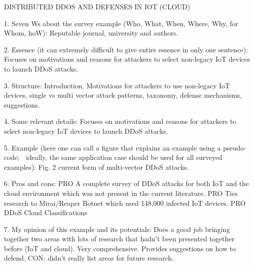 DISTRIBUTED DDOS AND DEFENSES IN IOT (CLOUD)

1. Seven Ws about the survey example (Who, What, When, Where, Why, for Whom, hoW): Reputable journal, university and authors.

2. Essence (it can extremely difficult to give entire essence in only one sentence): Focuses on  motivations and reasons for attackers to select non-legacy IoT devices to launch DDoS attacks.

3. Structure: Introduction, Motivations for attackers to use non-legacy IoT devices, single vs multi vector attack patterns, taxonomy, defense mechanisms, suggestions.

4. Some relevant details: Focuses on  motivations and reasons for attackers to select non-legacy IoT devices to launch DDoS attacks.

5. Example (here one can call a figure that explains an example using a pseudo-code;  ideally, the same application case should be used for all surveyed examples): Fig. 2 current form of multi-vector DDoS attacks.

6. Pros and cons:
PRO A complete survey of DDoS attacks for both IoT and the cloud environment which was not present in the current literature.
PRO Ties research to Mirai/Reaper Botnet which used 148,000 infected IoT devices.
PRO DDoS Cloud Classifications


7. My opinion of this example and its potentials: Does a good job bringing together two areas with lots of research that hadn't been presented together before (IoT and cloud). Very comprehensive. Provides suggestions on how to defend.
CON: didn't really list areas for future research.